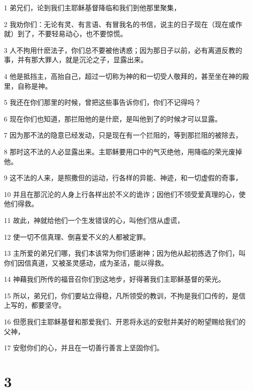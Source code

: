 \par 1 弟兄们，论到我们主耶稣基督降临和我们到他那里聚集，
\par 2 我劝你们：无论有灵、有言语、有冒我名的书信，说主的日子现在（现在或作就）到了，不要轻易动心，也不要惊慌。
\par 3 人不拘用什麽法子，你们总不要被他诱惑；因为那日子以前，必有离道反教的事，并有那大罪人，就是沉沦之子，显露出来。
\par 4 他是抵挡主，高抬自己，超过一切称为神的和一切受人敬拜的，甚至坐在神的殿里，自称是神。
\par 5 我还在你们那里的时候，曾把这些事告诉你们，你们不记得吗？
\par 6 现在你们也知道，那拦阻他的是什麽，是叫他到了的时候才可以显露。
\par 7 因为那不法的隐意已经发动，只是现在有一个拦阻的，等到那拦阻的被除去，
\par 8 那时这不法的人必显露出来。主耶稣要用口中的气灭绝他，用降临的荣光废掉他。
\par 9 这不法的人来，是照撒但的运动，行各样的异能、神迹，和一切虚假的奇事，
\par 10 并且在那沉沦的人身上行各样出於不义的诡诈；因他们不领受爱真理的心，使他们得救。
\par 11 故此，神就给他们一个生发错误的心，叫他们信从虚谎，
\par 12 使一切不信真理、倒喜爱不义的人都被定罪。
\par 13 主所爱的弟兄们哪，我们本该常为你们感谢神；因为他从起初拣选了你们，叫你们因信真道，又被圣灵感动，成为圣洁，能以得救。
\par 14 神藉我们所传的福音召你们到这地步，好得著我们主耶稣基督的荣光。
\par 15 所以，弟兄们，你们要站立得稳，凡所领受的教训，不拘是我们口传的，是信上写的，都要坚守。
\par 16 但愿我们主耶稣基督和那爱我们、开恩将永远的安慰并美好的盼望赐给我们的父神，
\par 17 安慰你们的心，并且在一切善行善言上坚固你们。

\chapter{3}

